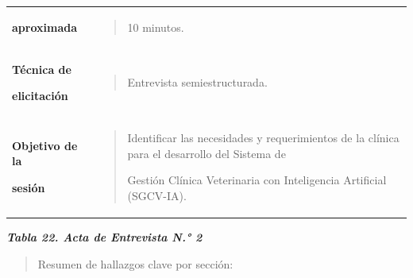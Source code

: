 \documentclass[
]{article}
\begin{document}
{\begin{longtable}[]{@{}
  >{\raggedright\arraybackslash}p{}
  >{\raggedright\arraybackslash}p{}@{}}
\textbf{aproximada} & \begin{minipage}[t]{\linewidth}\raggedright
\begin{quote}
10 minutos.
\end{quote}
\end{minipage} \\
\textbf{Técnica de}

\textbf{elicitación} & \begin{minipage}[t]{\linewidth}\raggedright
\begin{quote}
Entrevista semiestructurada.
\end{quote}
\end{minipage} \\
\textbf{Objetivo de la}

\textbf{sesión} & \begin{minipage}[t]{\linewidth}\raggedright
\begin{quote}
Identificar las necesidades y requerimientos de la clínica para el
desarrollo del Sistema de

Gestión Clínica Veterinaria con Inteligencia Artificial (SGCV-IA).
\end{quote}
\end{minipage} \\
\end{longtable}
}

\protect{}\label{_bookmark81}{}\emph{\textbf{Tabla 22. Acta
de Entrevista N.° 2}}

\begin{quote}
Resumen de hallazgos clave por sección:
\end{quote}
\end{document}
